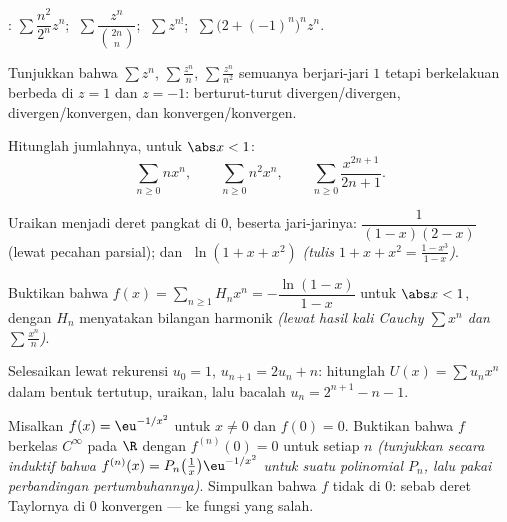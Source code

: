 \begin{exercise}[$\star$]\label{exo:b2:powerseries:1}
:
$\sum \dfrac{n^2}{2^n}z^n$; $\;\sum \dfrac{z^n}{\binom{2n}{n}}$;
$\;\sum z^{n!}$; $\;\sum \bigl(2 + (-1)^n\bigr)^n z^n$.
\end{exercise}

\begin{exercise}[$\star$]\label{exo:b2:powerseries:2}
Tunjukkan bahwa $\sum z^n$, $\sum \frac{z^n}{n}$, $\sum \frac{z^n}{n^2}$
semuanya berjari-jari $1$ tetapi berkelakuan berbeda di $z = 1$ dan $z =
-1$: berturut-turut divergen/divergen, divergen/konvergen, dan
konvergen/konvergen.
\end{exercise}

\begin{exercise}[$\star$]\label{exo:b2:powerseries:3}
Hitunglah jumlahnya, untuk $\abs x < 1$:
\[
\sum_{n\geq0} n x^n,
\qquad
\sum_{n\geq0} n^2 x^n,
\qquad
\sum_{n\geq0} \frac{x^{2n+1}}{2n+1} .
\]
\end{exercise}

\begin{exercise}[$\star\star$]\label{exo:b2:powerseries:4}
Uraikan menjadi deret pangkat di $0$, beserta jari-jarinya:
$\dfrac{1}{(1-x)(2-x)}$ (lewat pecahan parsial); dan $\;\ln(1 + x +
x^2)$ \emph{(tulis $1 + x + x^2 = \frac{1 - x^3}{1 - x}$)}.
\end{exercise}

\begin{exercise}[$\star\star$]\label{exo:b2:powerseries:5}
Buktikan bahwa $f(x) = \sum_{n\geq1} H_n x^n = -\dfrac{\ln(1 -
x)}{1 - x}$ untuk $\abs x < 1$, dengan $H_n$ menyatakan bilangan harmonik
\emph{(lewat hasil kali Cauchy $\sum x^n$ dan $\sum \frac{x^n}{n}$)}.
\end{exercise}

\begin{exercise}[$\star\star$]\label{exo:b2:powerseries:6}
Selesaikan lewat  rekurensi $u_0 = 1$, $u_{n+1} =
2u_n + n$: hitunglah $U(x) = \sum u_nx^n$ dalam bentuk tertutup, uraikan,
lalu bacalah $u_n = 2^{n+1} - n - 1$.
\end{exercise}

\begin{exercise}[$\star\star$]\label{exo:b2:powerseries:7}
Misalkan $f(x) = \eu^{-1/x^2}$ untuk $x \neq 0$ dan $f(0) = 0$.
Buktikan bahwa $f$ berkelas $C^\infty$ pada $\R$ dengan $f^{(n)}(0) = 0$
untuk setiap $n$ \emph{(tunjukkan secara induktif bahwa $f^{(n)}(x) =
P_n\bigl(\frac1x\bigr) \eu^{-1/x^2}$ untuk suatu polinomial $P_n$, lalu
pakai perbandingan pertumbuhannya)}. Simpulkan bahwa $f$ tidak 
di $0$: sebab deret Taylornya di $0$ konvergen --- ke fungsi yang salah.
\end{exercise}

